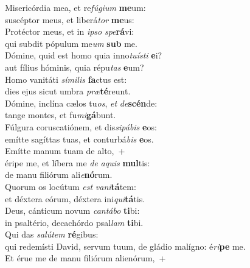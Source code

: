 \evenverse Misericórdia mea, et re\textit{fú}\textit{gi}\textit{um} \textbf{me}um:~\*\\
\evenverse suscéptor meus, et liberá\textit{tor} \textbf{me}us:\\
\oddverse Protéctor meus, et in \textit{i}\textit{pso} \textit{spe}\textbf{rá}vi:~\*\\
\oddverse qui subdit pópulum me\textit{um} \textbf{sub} me.\\
\evenverse Dómine, quid est homo quia inno\textit{tu}\textit{í}\textit{sti} \textbf{e}i?~\*\\
\evenverse aut fílius hóminis, quia répu\textit{tas} \textbf{e}um?\\
\oddverse Homo vanitáti \textit{sí}\textit{mi}\textit{lis} \textbf{fa}ctus est:~\*\\
\oddverse dies ejus sicut umbra \textit{præ}\textbf{té}reunt.\\
\evenverse Dómine, inclína cælos tu\textit{os}, \textit{et} \textit{de}\textbf{scén}de:~\*\\
\evenverse tange montes, et fu\textit{mi}\textbf{gá}bunt.\\
\oddverse Fúlgura coruscatiónem, et dis\textit{si}\textit{pá}\textit{bis} \textbf{e}os:~\*\\
\oddverse emítte sagíttas tuas, et conturbá\textit{bis} \textbf{e}os.\\
\evenverse Emítte manum tuam de alto,~+\\
\evenverse  éripe me, et líbera me \textit{de} \textit{a}\textit{quis} \textbf{mul}tis:~\*\\
\evenverse de manu filiórum ali\textit{e}\textbf{nó}rum.\\
\oddverse Quorum os locútum \textit{est} \textit{va}\textit{ni}\textbf{tá}tem:~\*\\
\oddverse et déxtera eórum, déxtera ini\textit{qui}\textbf{tá}tis.\\
\evenverse Deus, cánticum novum \textit{can}\textit{tá}\textit{bo} \textbf{ti}bi:~\*\\
\evenverse in psaltério, decachórdo psal\textit{lam} \textbf{ti}bi.\\
\oddverse Qui das \textit{sa}\textit{lú}\textit{tem} \textbf{ré}gibus:~\*\\
\oddverse qui redemísti David, servum tuum, de gládio malígno: é\textit{ri}\textbf{pe} me.\\
\evenverse Et érue me de manu filiórum alienórum,~+\\
